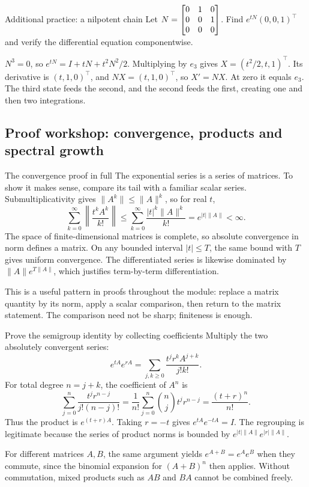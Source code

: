 \begin{question}{Additional practice: a nilpotent chain}
Let $N=\begin{bmatrix}0&1&0\\0&0&1\\0&0&0\end{bmatrix}$. Find $e^{tN}(0,0,1)^{\top}$ and verify the differential equation componentwise.
\end{question}
\begin{answer}
$N^3=0$, so $e^{tN}=I+tN+t^2N^2/2$. Multiplying by $e_3$ gives $X=(t^2/2,t,1)^{\top}$. Its derivative is $(t,1,0)^{\top}$, and $NX=(t,1,0)^{\top}$, so $X'=NX$. At zero it equals $e_3$. The third state feeds the second, and the second feeds the first, creating one and then two integrations.
\end{answer}


\subsection{Proof workshop: convergence, products and spectral growth}
\begin{concept}{The convergence proof in full}
The exponential series is a series of matrices. To show it makes sense, compare its tail with a familiar scalar series. Submultiplicativity gives $\|A^k\|\leq\|A\|^k$, so for real $t$,
\[\sum_{k=0}^{\infty}\left\|\frac{t^kA^k}{k!}\right\|\leq\sum_{k=0}^{\infty}\frac{|t|^k\|A\|^k}{k!}=e^{|t|\|A\|}<\infty.\]
The space of finite-dimensional matrices is complete, so absolute convergence in norm defines a matrix. On any bounded interval $|t|\leq T$, the same bound with $T$ gives uniform convergence. The differentiated series is likewise dominated by $\|A\|e^{T\|A\|}$, which justifies term-by-term differentiation.

This is a useful pattern in proofs throughout the module: replace a matrix quantity by its norm, apply a scalar comparison, then return to the matrix statement. The comparison need not be sharp; finiteness is enough.
\end{concept}
\begin{method}{Prove the semigroup identity by collecting coefficients}
Multiply the two absolutely convergent series:
\[e^{tA}e^{rA}=\sum_{j,k\geq0}\frac{t^jr^kA^{j+k}}{j!k!}.\]
For total degree $n=j+k$, the coefficient of $A^n$ is
\[\sum_{j=0}^{n}\frac{t^jr^{n-j}}{j!(n-j)!}=\frac1{n!}\sum_{j=0}^{n}\binom njt^jr^{n-j}=\frac{(t+r)^n}{n!}.\]
Thus the product is $e^{(t+r)A}$. Taking $r=-t$ gives $e^{tA}e^{-tA}=I$. The regrouping is legitimate because the series of product norms is bounded by $e^{|t|\|A\|}e^{|r|\|A\|}$.

For different matrices $A,B$, the same argument yields $e^{A+B}=e^Ae^B$ when they commute, since the binomial expansion for $(A+B)^n$ then applies. Without commutation, mixed products such as $AB$ and $BA$ cannot be combined freely.
\end{method}

